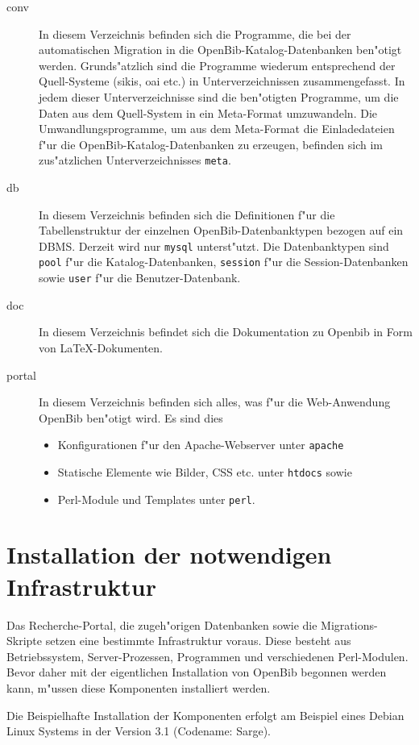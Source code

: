 \documentclass[11pt, twoside, a4paper, BCOR8mm, DIV12, bibtotoc,idxtotoc]{scrbook}
\begin{document}
\begin{description}
\item[conv] In diesem Verzeichnis befinden sich die Programme, die bei
  der automatischen Migration in die OpenBib-Katalog-Datenbanken
  ben"otigt werden. Grunds"atzlich sind die Programme wiederum
  entsprechend der Quell-Systeme (sikis, oai etc.) in
  Unterverzeichnissen zusammengefasst. In jedem dieser
  Unterverzeichnisse sind die ben"otigten Programme, um die Daten aus
  dem Quell-System in ein Meta-Format umzuwandeln. Die
  Umwandlungsprogramme, um aus dem Meta-Format die Einladedateien f"ur
  die OpenBib-Katalog-Datenbanken zu erzeugen, befinden sich im
  zus"atzlichen Unterverzeichnisses \texttt{meta}.
\item[db] In diesem Verzeichnis befinden sich die Definitionen f"ur
  die Tabellenstruktur der einzelnen OpenBib-Datenbanktypen bezogen
  auf ein DBMS. Derzeit wird nur \texttt{mysql} unterst"utzt. Die
  Datenbanktypen sind \texttt{pool} f"ur die Katalog-Datenbanken,
  \texttt{session} f"ur die Session-Datenbanken sowie \texttt{user}
  f"ur die Benutzer-Datenbank.
\item[doc] In diesem Verzeichnis befindet sich die Dokumentation zu
  Openbib in Form von LaTeX-Dokumenten.
\item[portal] In diesem Verzeichnis befinden sich alles, was f"ur die
  Web-Anwendung OpenBib ben"otigt wird. Es sind dies
  \begin{itemize}
  \item Konfigurationen f"ur den Apache-Webserver unter
    \texttt{apache}
  \item Statische Elemente wie Bilder, CSS etc. unter \texttt{htdocs} sowie
  \item Perl-Module und Templates unter \texttt{perl}.
  \end{itemize}
\end{description}

\chapter{Installation der notwendigen Infrastruktur}
Das Recherche-Portal, die zugeh"origen Datenbanken sowie die
Migrations-Skripte setzen eine bestimmte Infrastruktur voraus. Diese
besteht aus Betriebssystem, Server-Prozessen, Programmen und
verschiedenen Perl-Modulen. Bevor daher mit der eigentlichen
Installation von OpenBib begonnen werden kann, m"ussen diese
Komponenten installiert werden.

Die Beispielhafte Installation der Komponenten erfolgt am Beispiel
eines Debian Linux Systems in der Version 3.1 (Codename: Sarge).
\end{document}

